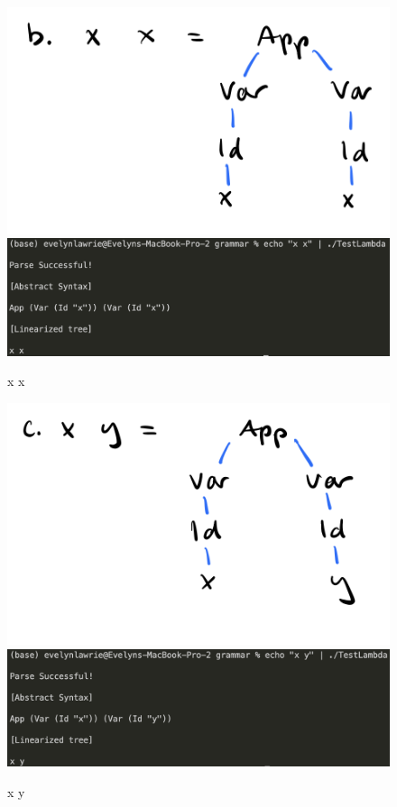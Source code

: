 \documentclass{article}
\theoremstyle{theorem}
\theoremstyle{definition}
\theoremstyle{remark}
\begin{document}
\begin{figure}[H]
\begin{center}
\includegraphics[scale=0.4]{img/bAST.png}
\\
\includegraphics[scale=0.4]{img/ASTb.png}
\end{center}
\caption{x x}\label{ASTb}
\end{figure}

\begin{figure}[H]
\begin{center}
\includegraphics[scale=0.4]{img/cAST.png}
\\
\includegraphics[scale=0.4]{img/ASTc.png}
\end{center}
\caption{x y}\label{ASTc}
\end{figure}
\end{document}
